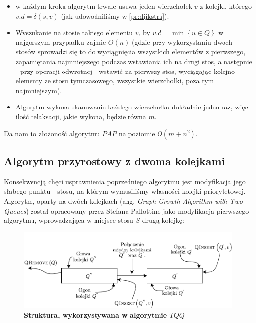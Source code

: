 \begin{itemize}
\item w każdym kroku algorytm trwale usuwa jeden wierzchołek $v$ z kolejki, którego $v.d = \delta \left( s, v \right)$ (jak udowodniliśmy w \ref{pr:dijkstra}).
\item Wyszukanie na stosie takiego elementu $v$, by $v.d = \min \left\{ u \in Q \right\}$ w najgorszym przypadku zajmie $ O \left( n \right) $ (gdzie przy wykorzystaniu dwóch stosów sprowadzi się to do wyciągnięcia wszystkich elementów z pierwszego, zapamiętania najmniejszego podczas wstawiania ich na drugi stos, a następnie - przy operacji odwrotnej - wstawić na pierwszy stos, wyciągając kolejno elementy ze stosu tymczasowego, wszystkie wierzchołki, poza tym najmniejszym).
\item Algorytm wykona skanowanie każdego wierzchołka dokładnie jeden raz, więc ilość relaksacji, jakie wykona, będzie równa $m$.
\end{itemize}

Da nam to złożoność algorytmu $PAP$ na poziomie $ O \left( m + n^{2} \right)$.

\subsection{Algorytm przyrostowy z dwoma kolejkami}

Konsekwencją chęci usprawnienia poprzedniego algorytmu jest modyfikacja jego słabego punktu - stosu, na którym wymusiliśmy własności kolejki priorytetowej. Algorytm, oparty na dwóch kolejkach (ang. \textit{Graph Growth Algorithm with Two Queues}) został opracowany przez Stefana Pallottino jako modyfikacja pierwszego algorytmu, wprowadzająca w miejsce stosu $S$ drugą kolejkę:

\begin{figure}[!htbp]
	\centering
	\includegraphics[width=\textwidth]{Chapter_III/GRAPH-GROWTH-2Q-Other/a.pdf}
	\caption{\textbf{Struktura, wykorzystywana w algorytmie $TQQ$} } \label{fig:exampleTQQStructure}
\end{figure}

